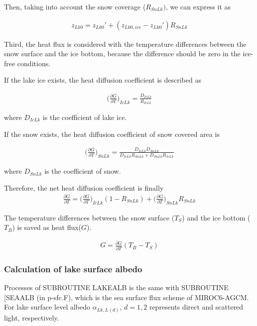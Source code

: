 Then, taking into account the snow coverage (\(R_{SnLk})\), we can express it as

\begin{eqnarray}
    {z_{Lk0}} = {z_{Lk0}'} + (z_{Lk0,ice} - {z_{Lk0}'}) R_{SnLk}
\end{eqnarray}

Third, the heat flux is considered with the temperature differences between the snow surface and the ice bottom, because the difference should be zero in the ice-free conditions.

If the lake ice exists, the heat diffusion coefficient is described as

\begin{eqnarray}
    \Big(\frac{\partial G}{\partial T}\Big) _{ IcLk }  = \frac{ D_{IcLk}}{R_{IcLk}}
\end{eqnarray}

where \(D_{IcLk}\) is the coefficient of lake ice.

If the snow exists, the heat diffusion coefficient of snow covered area is

\begin{eqnarray}
    \Big(\frac{\partial G}{\partial T}\Big)_{SnLk}  =  \frac{D_{IcLk}D_{SnLk}}{D_{IcLk}R_{SnLk}+D_{SnLk}R_{IcLk}}
\end{eqnarray}

where \(D_{SnLk}\) is the coefficient of snow.

Therefore, the net heat diffusion coefficient is finally \begin{eqnarray}
    \frac{\partial G}{\partial T} = \Big(\frac{\partial G}{\partial T} \Big)_{IcLk} (1-R_{SnLk}) + \Big(\frac{\partial G}{\partial T}\Big)_{SnLk} R_{SnLk}
\end{eqnarray}

The temperature differences between the snow surface (\(T_S\)) and the ice bottom (\(T_B\)) is saved as heat flux(\(G\)).

\begin{eqnarray}
    G = \frac{\partial G}{\partial T} (T_B-T_S)
\end{eqnarray}

\subsubsection{Calculation of lake surface albedo}\label{calculation-of-lake-surface-albedo}

Processes of SUBROUTINE LAKEALB is the same with SUBROUTINE {[}SEAALB (in p-sfc.F), which is the sea surface flux scheme of MIROC6-AGCM\citep{Tatebe2019-ow}. For lake surface level albedo
\(\alpha_{Lk,L(d)}\), \(d=1,2\) represents direct and scattered light, respectively.

